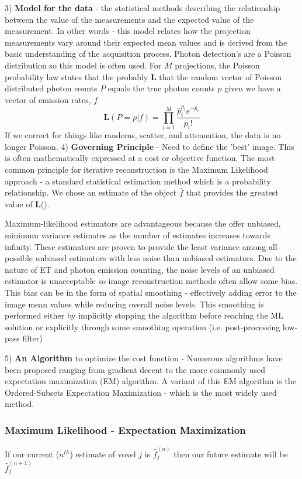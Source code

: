 \documentclass{article}
\begin{document}
3) \textbf{Model for the data} - the statistical methods describing the relationship between the value of the measurements and the expected value of the measurement. In other words - this model relates how the projection measurements vary around their expected mean values and is derived from the basic understanding of the acquisition process. Photon detection's are a Poisson distribution so this model is often used. For $M$ projections, the Poisson probability law states that the probably $\textbf{L}$ that the random vector of Poisson distributed photon counts $P$ equals the true photon counts $p$ given we have a vector of emission rates, $f$
\begin{equation}
	\textbf{L}(P=p|f) = \prod_{i=1}^M \frac{\bar{p}_i^{p_i}  e^{-\bar{p}_i}}{p_i!}
\end{equation}
If we correct for things like randoms, scatter, and attenuation, the data is no longer Poisson.
4) \textbf{Governing Principle} - Need to define the 'best' image. This is often mathematically expressed at a cost or objective function. The most common principle for iterative reconstruction is the Maximum Likelihood approach - a standard statistical estimation method which is a probability relationship. We chose an estimate of the object $\hat{f}$ that provides the greatest value of $\textbf{L}$().

Maximum-likelihood estimators are advantageous because the offer unbiased, minimum variance estimates as the number of estimates increases towards infinity. These estimators are proven to provide the least variance among all possible unbiased estimators with less noise than unbiased estimators. Due to the nature of ET and photon emission counting, the noise levels of an unbiased estimator is unacceptable so image reconstruction methods often allow some bias. This bias can be in the form of spatial smoothing - effectively adding error to the image mean values while reducing overall noise levels. This smoothing is performed either by implicitly stopping the algorithm before reaching the ML solution or explicitly through some smoothing operation (i.e. post-processing low-pass filter)

5) \textbf{An Algorithm} to optimize the cost function - Numerous algorithms have been proposed ranging from gradient decent to the more commonly used expectation maximization (EM) algorithm. A variant of this EM algorithm is the Ordered-Subsets Expectation Maximization - which is the most widely used method. 

\subsubsection{Maximum Likelihood - Expectation Maximization}
If our current ($n^{th}$) estimate of voxel $j$ is $\hat{f}^{(n)}_j$ then our future estimate will be $\hat{f}^{(n+1)}_j$
\end{document}
